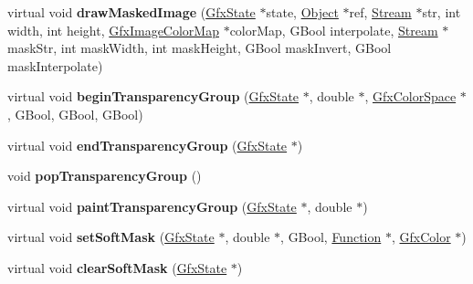 \begin{DoxyCompactItemize}
\item 
\mbox{\label{class_cairo_output_dev_ab5b5447e876d7e68eeb25c4136c82b8c}} 
virtual void {\bfseries draw\+Masked\+Image} (\hyperlink{class_gfx_state}{Gfx\+State} $\ast$state, \hyperlink{class_object}{Object} $\ast$ref, \hyperlink{class_stream}{Stream} $\ast$str, int width, int height, \hyperlink{class_gfx_image_color_map}{Gfx\+Image\+Color\+Map} $\ast$color\+Map, G\+Bool interpolate, \hyperlink{class_stream}{Stream} $\ast$mask\+Str, int mask\+Width, int mask\+Height, G\+Bool mask\+Invert, G\+Bool mask\+Interpolate)
\item 
\mbox{\label{class_cairo_output_dev_a7c814856a88ae203d71dd8d8f1c55604}} 
virtual void {\bfseries begin\+Transparency\+Group} (\hyperlink{class_gfx_state}{Gfx\+State} $\ast$, double $\ast$, \hyperlink{class_gfx_color_space}{Gfx\+Color\+Space} $\ast$, G\+Bool, G\+Bool, G\+Bool)
\item 
\mbox{\label{class_cairo_output_dev_afccf37ab9b01741c6a472fdf3ff54515}} 
virtual void {\bfseries end\+Transparency\+Group} (\hyperlink{class_gfx_state}{Gfx\+State} $\ast$)
\item 
\mbox{\label{class_cairo_output_dev_ab206165b96cf2e0cce425ad1772d87cf}} 
void {\bfseries pop\+Transparency\+Group} ()
\item 
\mbox{\label{class_cairo_output_dev_a1981c7f1251b33cda753ee1d1e3c53ad}} 
virtual void {\bfseries paint\+Transparency\+Group} (\hyperlink{class_gfx_state}{Gfx\+State} $\ast$, double $\ast$)
\item 
\mbox{\label{class_cairo_output_dev_ab05e1b028b2ed6f2412168770d29fa90}} 
virtual void {\bfseries set\+Soft\+Mask} (\hyperlink{class_gfx_state}{Gfx\+State} $\ast$, double $\ast$, G\+Bool, \hyperlink{class_function}{Function} $\ast$, \hyperlink{struct_gfx_color}{Gfx\+Color} $\ast$)
\item 
\mbox{\label{class_cairo_output_dev_ac4eaf6145e2844126796ba9df8470155}} 
virtual void {\bfseries clear\+Soft\+Mask} (\hyperlink{class_gfx_state}{Gfx\+State} $\ast$)
\item 
\mbox{\label{class_cairo_output_dev_a66c39dbbc9270b515d2a8bf0b2058ec9}} 

\end{DoxyCompactItemize}
